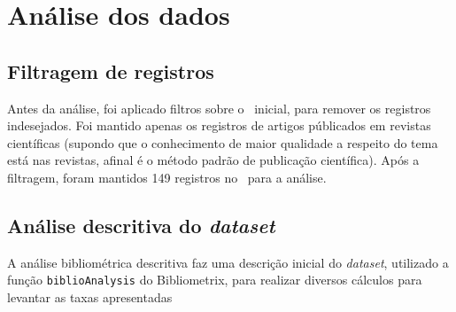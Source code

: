\section{Análise dos dados}

\subsection{Filtragem de registros}

Antes da análise, foi aplicado filtros sobre o \dataset\ inicial, para remover os registros indesejados. Foi mantido apenas os registros de artigos públicados em revistas científicas (supondo que o conhecimento de maior qualidade a respeito do tema está nas revistas, afinal é o método padrão de publicação científica).  Após a filtragem, foram mantidos 149 registros  no \dataset\ para a análise.

\subsection{Análise descritiva do \textit{dataset} }

A análise bibliométrica descritiva faz uma descrição inicial do \textit{dataset}, utilizado a função \texttt{biblioAnalysis} do Bibliometrix, para realizar diversos cálculos para levantar as taxas apresentadas

